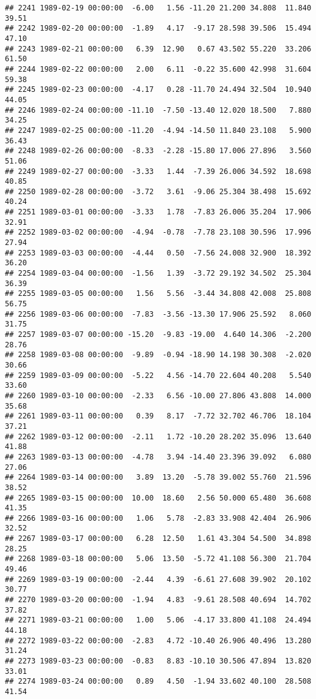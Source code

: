 \documentclass{article}\usepackage{graphicx, color}
\makeatletter
\newenvironment{kframe}{%
 \def\at@end@of@kframe{}%
 \ifinner\ifhmode%
  \def\at@end@of@kframe{\end{minipage}}%
  \begin{minipage}{\columnwidth}%
 \fi\fi%
 \def\FrameCommand##1{\hskip\@totalleftmargin \hskip-\fboxsep
 \colorbox{shadecolor}{##1}\hskip-\fboxsep
     \hskip-\linewidth \hskip-\@totalleftmargin \hskip\columnwidth}%
 \MakeFramed {\advance\hsize-\width
   \@totalleftmargin\z@ \linewidth\hsize
   \@setminipage}}%
 {\par\unskip\endMakeFramed%
 \at@end@of@kframe}
\newenvironment{knitrout}{}{} %
\makeatother
\begin{document}
\begin{knitrout}
\begin{kframe}
\begin{verbatim}
## 2241 1989-02-19 00:00:00  -6.00   1.56 -11.20 21.200 34.808  11.840  39.51
## 2242 1989-02-20 00:00:00  -1.89   4.17  -9.17 28.598 39.506  15.494  47.10
## 2243 1989-02-21 00:00:00   6.39  12.90   0.67 43.502 55.220  33.206  61.50
## 2244 1989-02-22 00:00:00   2.00   6.11  -0.22 35.600 42.998  31.604  59.38
## 2245 1989-02-23 00:00:00  -4.17   0.28 -11.70 24.494 32.504  10.940  44.05
## 2246 1989-02-24 00:00:00 -11.10  -7.50 -13.40 12.020 18.500   7.880  34.25
## 2247 1989-02-25 00:00:00 -11.20  -4.94 -14.50 11.840 23.108   5.900  36.43
## 2248 1989-02-26 00:00:00  -8.33  -2.28 -15.80 17.006 27.896   3.560  51.06
## 2249 1989-02-27 00:00:00  -3.33   1.44  -7.39 26.006 34.592  18.698  40.85
## 2250 1989-02-28 00:00:00  -3.72   3.61  -9.06 25.304 38.498  15.692  40.24
## 2251 1989-03-01 00:00:00  -3.33   1.78  -7.83 26.006 35.204  17.906  32.91
## 2252 1989-03-02 00:00:00  -4.94  -0.78  -7.78 23.108 30.596  17.996  27.94
## 2253 1989-03-03 00:00:00  -4.44   0.50  -7.56 24.008 32.900  18.392  36.20
## 2254 1989-03-04 00:00:00  -1.56   1.39  -3.72 29.192 34.502  25.304  36.39
## 2255 1989-03-05 00:00:00   1.56   5.56  -3.44 34.808 42.008  25.808  56.75
## 2256 1989-03-06 00:00:00  -7.83  -3.56 -13.30 17.906 25.592   8.060  31.75
## 2257 1989-03-07 00:00:00 -15.20  -9.83 -19.00  4.640 14.306  -2.200  28.76
## 2258 1989-03-08 00:00:00  -9.89  -0.94 -18.90 14.198 30.308  -2.020  30.66
## 2259 1989-03-09 00:00:00  -5.22   4.56 -14.70 22.604 40.208   5.540  33.60
## 2260 1989-03-10 00:00:00  -2.33   6.56 -10.00 27.806 43.808  14.000  35.68
## 2261 1989-03-11 00:00:00   0.39   8.17  -7.72 32.702 46.706  18.104  37.21
## 2262 1989-03-12 00:00:00  -2.11   1.72 -10.20 28.202 35.096  13.640  41.88
## 2263 1989-03-13 00:00:00  -4.78   3.94 -14.40 23.396 39.092   6.080  27.06
## 2264 1989-03-14 00:00:00   3.89  13.20  -5.78 39.002 55.760  21.596  38.52
## 2265 1989-03-15 00:00:00  10.00  18.60   2.56 50.000 65.480  36.608  41.35
## 2266 1989-03-16 00:00:00   1.06   5.78  -2.83 33.908 42.404  26.906  32.52
## 2267 1989-03-17 00:00:00   6.28  12.50   1.61 43.304 54.500  34.898  28.25
## 2268 1989-03-18 00:00:00   5.06  13.50  -5.72 41.108 56.300  21.704  49.46
## 2269 1989-03-19 00:00:00  -2.44   4.39  -6.61 27.608 39.902  20.102  30.77
## 2270 1989-03-20 00:00:00  -1.94   4.83  -9.61 28.508 40.694  14.702  37.82
## 2271 1989-03-21 00:00:00   1.00   5.06  -4.17 33.800 41.108  24.494  44.18
## 2272 1989-03-22 00:00:00  -2.83   4.72 -10.40 26.906 40.496  13.280  31.24
## 2273 1989-03-23 00:00:00  -0.83   8.83 -10.10 30.506 47.894  13.820  33.01
## 2274 1989-03-24 00:00:00   0.89   4.50  -1.94 33.602 40.100  28.508  41.54

\end{verbatim}
\end{kframe}
\end{knitrout}
\end{document}
